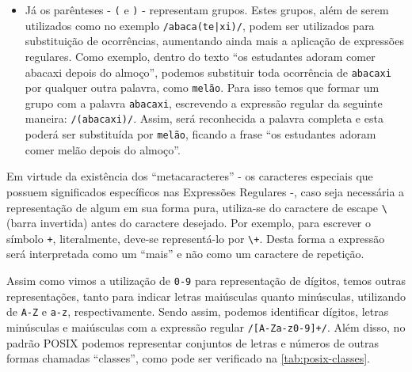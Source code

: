 \begin{itemize}
    \item Já os parênteses - \texttt{(} e \texttt{)} - representam grupos. Estes grupos, além de serem utilizados como no exemplo \texttt{/abaca(te|xi)/}, podem ser utilizados para substituição de ocorrências, aumentando ainda mais a aplicação de expressões regulares. Como exemplo, dentro do texto ``os estudantes adoram comer abacaxi depois do almoço'', podemos substituir toda ocorrência de \texttt{abacaxi} por qualquer outra palavra, como \texttt{melão}. Para isso temos que formar um grupo com a palavra \texttt{abacaxi}, escrevendo a expressão regular da seguinte maneira: \texttt{/(abacaxi)/}. Assim, será reconhecida a palavra completa e esta poderá ser substituída por \texttt{melão}, ficando a frase ``os estudantes adoram comer melão depois do almoço''.

\end{itemize}

Em virtude da existência dos ``metacaracteres'' - os caracteres especiais que possuem significados específicos nas Expressões Regulares -, caso seja necessária a representação de algum em sua forma pura, utiliza-se do caractere de escape \texttt{\textbackslash{}} (barra invertida) antes do caractere desejado. Por exemplo, para escrever o símbolo \texttt{+}, literalmente, deve-se representá-lo por \texttt{\textbackslash{+}}. Desta forma a expressão será interpretada como um ``mais'' e não como um caractere de repetição.

Assim como vimos a utilização de \texttt{0-9} para representação de dígitos, temos outras representações, tanto para indicar letras maiúsculas quanto minúsculas, utilizando de \texttt{A-Z} e \texttt{a-z}, respectivamente. Sendo assim, podemos identificar dígitos, letras minúsculas e maiúsculas com a expressão regular \texttt{/[A-Za-z0-9]+/}. Além disso, no padrão POSIX podemos representar conjuntos de letras e números de outras formas chamadas ``classes'', como pode ser verificado na \autoref{tab:posix-classes}.

